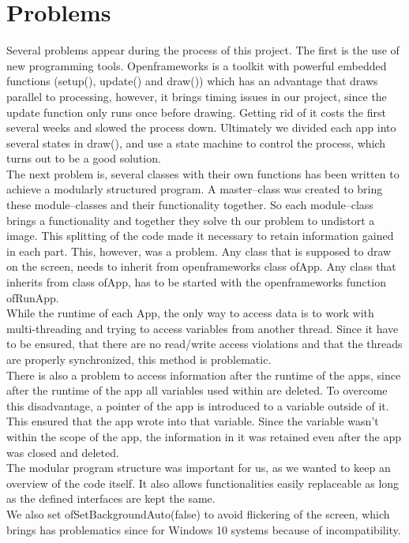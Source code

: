 \documentclass[journal,final,a4paper,twoside]{PS}
\begin{document}
\section{Problems}
\label{sec:probs}
Several problems appear during the process of this project.
The first is the use of new programming tools. Openframeworks is a toolkit with powerful embedded functions (setup(), update() and draw()) which has an advantage that draws parallel to processing, however, it brings timing issues in our project, since the update function only runs once before drawing. Getting rid of it costs the first several weeks and slowed the process down. Ultimately we divided each app into several states in draw(), and use a state machine to control the process, which turns out to be a good solution.  \\
The next problem is, several classes with their own functions has been written to achieve a modularly structured program. A  master--class was created to bring these module--classes and their functionality together. So each module--class brings a functionality and together they solve th our problem to undistort a image. This splitting of the code made it necessary to retain information gained in each part. This, however, was a problem. Any class that is supposed to draw on the screen, needs to inherit from openframeworks class ofApp. Any class that inherits from class ofApp, has to be started with the openframeworks function ofRunApp.\\
While the runtime of each App, the only way to access data is to work with multi-threading and trying to access variables from another thread. Since it have to be ensured, that there are no read/write access violations and that the threads are properly synchronized, this method is problematic. \\
There is also a problem to access information after the runtime of the apps, since after the runtime of the app all variables used within are deleted. To overcome this disadvantage, a pointer of the app is introduced to a variable outside of it. This ensured that the app wrote into that variable. Since the variable wasn't within the scope of the app, the information in it was retained even after the app was closed and deleted.\\
The modular program structure was important for us, as we wanted to keep an overview of the code itself. It also allows functionalities easily replaceable as long as the defined interfaces are kept the same.
\\
We also set ofSetBackgroundAuto(false) to avoid flickering of the screen, which brings has problematics since for Windows 10 systems because of incompatibility. 
\end{document}
